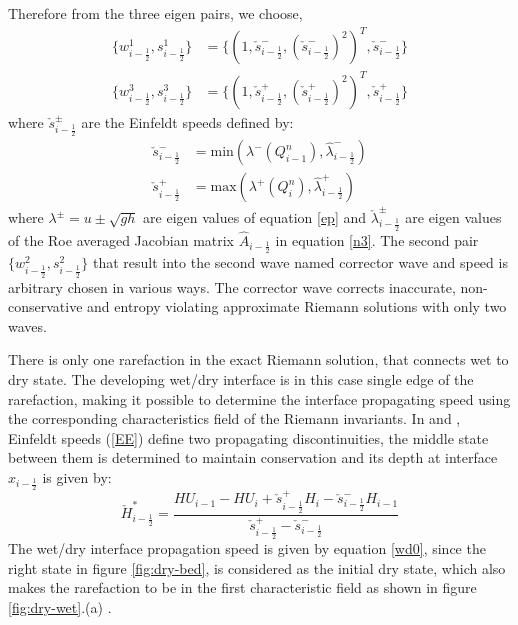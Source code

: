 \documentclass[12pt,a4paper]{article}
\begin{document}
	Therefore from the three eigen pairs, we choose, 
	\begin{equation}
		\begin{aligned}
			\{w^{1}_{i-\frac{1}{2}},s^{1}_{i-\frac{1}{2}}\} &= \{(1,\check{s}_{i-\frac{1}{2}}^{-} ,(\check{s}_{i-\frac{1}{2}}^{-} )^{2})^{T},\check{s}_{i-\frac{1}{2}}^{-} \} \\
			\{w^{3}_{i-\frac{1}{2}},s^{3}_{i-\frac{1}{2}}\} &= \{(1,\check{s}_{i-\frac{1}{2}}^{+} ,(\check{s}_{i-\frac{1}{2}}^{+} )^{2})^{T},\check{s}_{i-\frac{1}{2}}^{+} \} 
		\end{aligned}
	\end{equation}
	where $\check{s}_{i-\frac{1}{2}}^{\pm}$ are the Einfeldt speeds defined by:
	\begin{equation}
		\begin{aligned}
			\check{s}_{i-\frac{1}{2}}^{-} &= \text{min}(\lambda^{-}(Q^n_{i-1}),\hat{\lambda}_{i-\frac{1}{2}}^{-}) \\
			\check{s}_{i-\frac{1}{2}}^{+} &= \text{max}(\lambda^{+}(Q^n_{i}),\hat{\lambda}_{i-\frac{1}{2}}^{+})
		\end{aligned}
		\label{EE}
	\end{equation}
	where $\lambda^{\pm} = u\pm \sqrt{gh}$ are eigen values of equation \eqref{ep} and $\check{\lambda}_{i-\frac{1}{2}}^{\pm}$ are eigen values of the Roe averaged Jacobian matrix $\hat{A}_{i-\frac{1}{2}}$ in equation \eqref{n3}. The second pair $	\{w^{2}_{i-\frac{1}{2}},s^{2}_{i-\frac{1}{2}}\}$  that result into the second wave named corrector wave and speed is arbitrary chosen in various ways. The corrector wave corrects inaccurate, non-conservative and entropy violating approximate Riemann solutions with only two waves\cite{be-ge-le-ma:2011}.
	
	
	There is only one rarefaction in the exact Riemann solution, that connects wet to dry state. The developing wet/dry interface is in this case single edge of the rarefaction, making it possible to determine the interface propagating speed using the corresponding characteristics field of the Riemann invariants\cite{le-ge-be:2011}. In \citealp{george2006finite} and \cite{ge:2008}, Einfeldt speeds (\eqref{EE})  define two propagating discontinuities, the  middle state between them is determined to maintain conservation and its depth at interface $x_{i-\frac{1}{2}}$ is given by:
	\begin{equation}
		\check{H}^{*}_{i-\frac{1}{2}} = \frac{HU_{i-1} -HU_{i} + \check{s}_{i-\frac{1}{2}}^{+}H_{i} -\check{s}_{i-\frac{1}{2}}^{-} H_{i-1}  }{\check{s}_{i-\frac{1}{2}}^{+} - \check{s}_{i-\frac{1}{2}}^{-}  }
	\end{equation}
	The wet/dry interface propagation  speed  is given by equation \eqref{wd0}, since the right state in figure \ref{fig:dry-bed}, is considered as the initial dry state, which also makes the rarefaction to be in the first characteristic field as shown in figure \ref{fig:dry-wet}.(a) \cite{ge:2008}.
	
\end{document}
